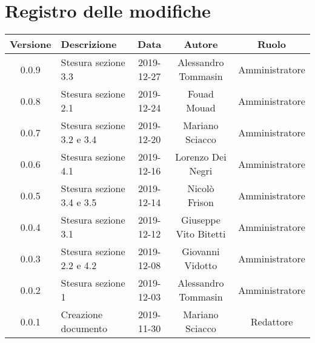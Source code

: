 \section*{Registro delle modifiche}

\begin{center}
	\begin{longtable}{|c|p{4cm}|c|c|c|}
	\hline
	\rowcolor{lighter-grayer}
	\textbf{Versione} & \textbf{Descrizione} & \textbf{Data} & \textbf{Autore} & \textbf{Ruolo} \\
	\hline
	\endfirsthead



	\hline
	0.0.9 & Stesura sezione 3.3 & 2019-12-27 & Alessandro Tommasin & Amministratore \\
	\hline
	0.0.8 & Stesura sezione 2.1 & 2019-12-24 & Fouad Mouad & Amministratore \\
	\hline
	0.0.7 & Stesura sezione 3.2 e 3.4 & 2019-12-20 & Mariano Sciacco & Amministratore \\
	\hline
	0.0.6 & Stesura sezione 4.1 & 2019-12-16 & Lorenzo Dei Negri & Amministratore \\
	\hline
	0.0.5 & Stesura sezione 3.4 e 3.5 & 2019-12-14 & Nicolò Frison & Amministratore \\
	\hline
	0.0.4 & Stesura sezione 3.1 & 2019-12-12 & Giuseppe Vito Bitetti & Amministratore \\
	\hline
	0.0.3 & Stesura sezione 2.2 e 4.2 & 2019-12-08 & Giovanni Vidotto & Amministratore \\
	\hline
	0.0.2 & Stesura sezione 1 & 2019-12-03 & Alessandro Tommasin & Amministratore \\
	\hline
	0.0.1 & Creazione documento & 2019-11-30 & Mariano Sciacco & Redattore \\
	\hline

	\end{longtable}
\end{center}
